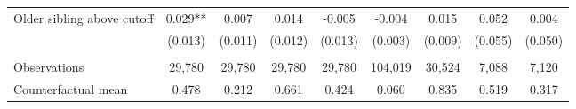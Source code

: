 {{\begin{tabular}{lcccccccc}
Older sibling above cutoff&       0.029** &       0.007   &       0.014   &      -0.005   &      -0.004   &       0.015   &       0.052   &       0.004   \\
                    &     (0.013)   &     (0.011)   &     (0.012)   &     (0.013)   &     (0.003)   &     (0.009)   &     (0.055)   &     (0.050)   \\
                    &               &               &               &               &               &               &               &               \\
Observations        &      29,780   &      29,780   &      29,780   &      29,780   &     104,019   &      30,524   &       7,088   &       7,120   \\
Counterfactual mean &       0.478   &       0.212   &       0.661   &       0.424   &       0.060   &       0.835   &       0.519   &       0.317   \\
 

\bottomrule
\end{tabular}
}
}
